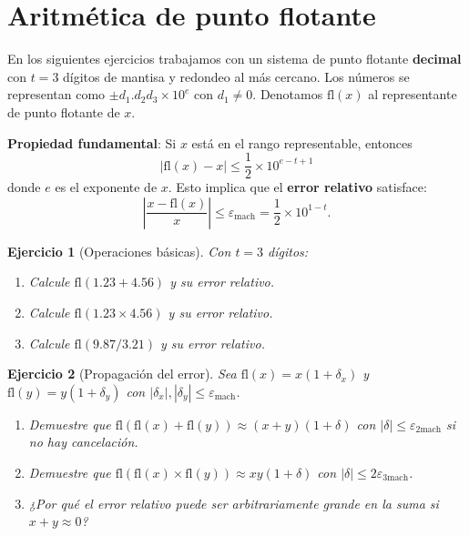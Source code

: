 \documentclass[12pt]{article}
\newtheorem{exercise}{Ejercicio}
\begin{document}
\section*{Aritmética de punto flotante}

En los siguientes ejercicios trabajamos con un sistema de punto flotante \textbf{decimal} con $t = 3$ dígitos de mantisa y redondeo al más cercano. Los números se representan como $\pm d_1.d_2d_3 \times 10^e$ con $d_1 \neq 0$. Denotamos $\text{fl}(x)$ al representante de punto flotante de $x$.

\textbf{Propiedad fundamental}: Si $x$ está en el rango representable, entonces
\[
|\text{fl}(x) - x| \leq \frac{1}{2} \times 10^{e-t+1}
\]
donde $e$ es el exponente de $x$. Esto implica que el \textbf{error relativo} satisface:
\[
\left|\frac{x - \text{fl}(x)}{x}\right| \leq \varepsilon_{\text{mach}} = \frac{1}{2} \times 10^{1-t}.
\]

\begin{exercise}[Operaciones básicas]
Con $t = 3$ dígitos:
\begin{enumerate}
\item Calcule $\text{fl}(1.23 + 4.56)$ y su error relativo.
\item Calcule $\text{fl}(1.23 \times 4.56)$ y su error relativo.
\item Calcule $\text{fl}(9.87 / 3.21)$ y su error relativo.
\end{enumerate}
\end{exercise}

\begin{exercise}[Propagación del error]
Sea $\text{fl}(x) = x(1 + \delta_x)$ y $\text{fl}(y) = y(1 + \delta_y)$ con $|\delta_x|, |\delta_y| \leq \varepsilon_{\text{mach}}$.
\begin{enumerate}
\item Demuestre que $\text{fl}(\text{fl}(x) + \text{fl}(y)) \approx (x+y)(1 + \delta)$ con $|\delta| \leq \varepsilon_{2\text{mach}}$ si no hay cancelación.
\item Demuestre que $\text{fl}(\text{fl}(x) \times \text{fl}(y)) \approx xy(1 + \delta)$ con $|\delta| \leq 2\varepsilon_{3\text{mach}}$.
\item ¿Por qué el error relativo puede ser arbitrariamente grande en la suma si $x + y \approx 0$?
\end{enumerate}
\end{exercise}
\end{document}

